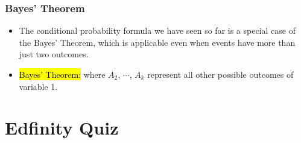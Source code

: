 \documentclass[slidestop,compress,mathserif]{beamer}
\begin{document}
\begin{frame}
\frametitle{Bayes' Theorem}

\begin{itemize}

\item The conditional probability formula we have seen so far is a special case of the Bayes' Theorem, which is applicable even when events have more than just two outcomes.

\pause 

\item \hl{Bayes' Theorem:}
where $A_2$, $\cdots$, $A_k$ represent all other possible outcomes of variable 1.

\end{itemize}

\end{frame}

\section{Edfinity Quiz}


\end{document}
